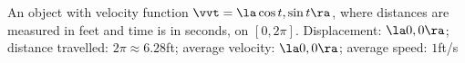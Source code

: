 {An object with velocity function $\vvt = \la \cos t,\sin t\ra$, where distances are measured in feet and time is in seconds, on $[0,2\pi]$.
}
{Displacement: $\la 0,0\ra$; distance travelled: $2\pi \approx 6.28$ft; average velocity: $\la 0,0\ra$; average speed: $1$ft/s
}